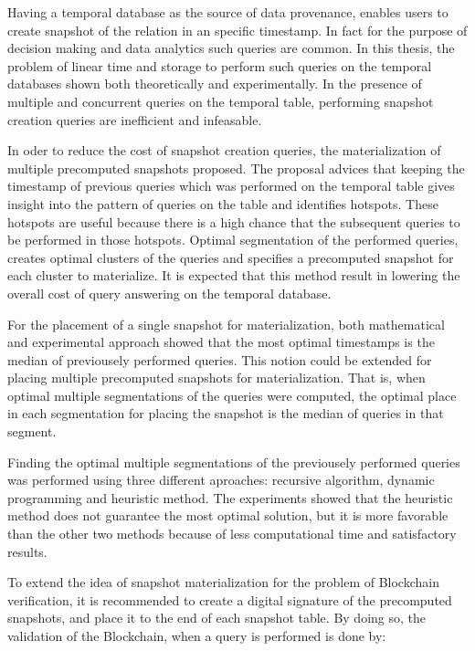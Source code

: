 		Having a temporal database as the source of data provenance, enables users to create snapshot of the relation in an specific timestamp. In fact for the purpose of decision making and data analytics such queries are common. In this thesis, the problem of linear time and storage to perform such queries on the temporal databases shown both theoretically and experimentally. In the presence of multiple and concurrent queries on the temporal table, performing snapshot creation queries are inefficient and infeasable. 

		In oder to reduce the cost of snapshot creation queries, the materialization of multiple precomputed snapshots proposed. The proposal advices that keeping the timestamp of previous queries which was performed on the temporal table gives insight into the pattern of queries on the table and identifies hotspots. These hotspots are useful because there is a high chance that the subsequent queries to be performed in those hotspots. Optimal segmentation of the performed queries, creates optimal clusters of the queries and specifies a precomputed snapshot for each cluster to materialize. It is expected that this method result in lowering the overall cost of query answering on the temporal database.

		For the placement of a single snapshot for materialization, both mathematical and experimental approach showed that the most optimal timestamps is the median of previousely performed queries. This notion could be extended for placing multiple precomputed snapshots for materialization. That is, when optimal multiple segmentations of the queries were computed, the optimal place in each segmentation for placing the snapshot is the median of queries in that segment.

		Finding the optimal multiple segmentations of the previousely performed queries was performed using three different aproaches: recursive algorithm, dynamic programming and heuristic method. The experiments showed that the heuristic method does not guarantee the most optimal solution, but it is more favorable than the other two methods because of less computational time and satisfactory results.

		To extend the idea of snapshot materialization for the problem of Blockchain verification, it is recommended to create a digital signature of the precomputed snapshots, and place it to the end of each snapshot table. By doing so, the validation of the Blockchain, when a query is performed is done by:

